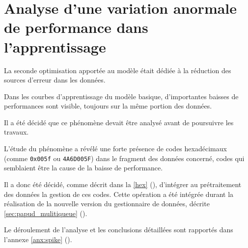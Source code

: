\section{Analyse d'une variation anormale de performance dans l'apprentissage} \label{sec:spike}
La seconde optimisation apportée au modèle était dédiée à la réduction des sources d'erreur dans les données.

Dans les courbes d'apprentissage du modèle basique, d'importantes baisses de performances sont visible, toujours sur la même portion des données.

Il a été décidé que ce phénomène devait être analysé avant de poursuivre les travaux.

L'étude du phénomène a révélé une forte présence de codes hexadécimaux (comme \lstinline|0x005f| ou \lstinline|4A6D005F|) dans le fragment des données concerné, codes qui semblaient être la cause de la baisse de performance.

Il a donc été décidé, comme décrit dans la \autoref{hex} (), d'intégrer au prétraitement des données la gestion de ces codes.
Cette opération a été intégrée durant la réalisation de la nouvelle version du gestionnaire de données, décrite \autoref{sec:papud_mulitiqueue} ().

Le déroulement de l'analyse et les conclusions détaillées sont rapportés dans l'annexe \ref{anx:spike} ().
